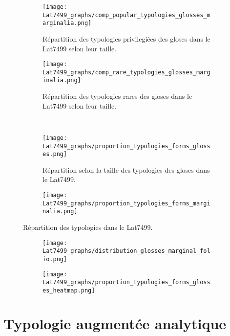 \documentclass[a4paper, twoside, 12pt]{book}
\begin{document}
{\begin{figure}[H]
\centering
\begin{subfigure}{0.80\textwidth}
  \centering
  \texttt{[image: Lat7499\_graphs/comp\_popular\_typologies\_glosses\_marginalia.png]}
  \caption{Répartition des typologies privilegiées des gloses dans le Lat7499 selon leur taille.}
\end{subfigure}
\begin{subfigure}{0.80\textwidth}
  \centering
  \texttt{[image: Lat7499\_graphs/comp\_rare\_typologies\_glosses\_marginalia.png]}
  \caption{Répartition des typologies rares des gloses dans le Lat7499 selon leur taille.}
\end{subfigure}
\\
\hfill
\begin{subfigure}{0.45\textwidth}
  \centering
  \texttt{[image: Lat7499\_graphs/proportion\_typologies\_forms\_glosses.png]}
 \caption{Répartition selon la taille des typologies des gloses dans le Lat7499.}
\end{subfigure}
\begin{subfigure}{0.45\textwidth}
  \centering
  \texttt{[image: Lat7499\_graphs/proportion\_typologies\_forms\_marginalia.png]}
  \label{fig:Lat7499typologies_marginalia}
\end{subfigure}
\caption{Répartition des typologies dans le Lat7499.}
\label{fig:Lat7499typologies}
\end{figure}


\begin{figure}
  \centering
  
  \begin{subfigure}{\textwidth}
    \centering
    \texttt{[image: Lat7499\_graphs/distribution\_glosses\_marginal\_folio.png]}
  \end{subfigure}
  
  \vspace{0.5cm} %
  
  \begin{subfigure}{\textwidth}
    \centering
    \texttt{[image: Lat7499\_graphs/proportion\_typologies\_forms\_glosses\_heatmap.png]}
  \end{subfigure}

\end{figure}



\section{Typologie augmentée analytique}

}
\end{document}
